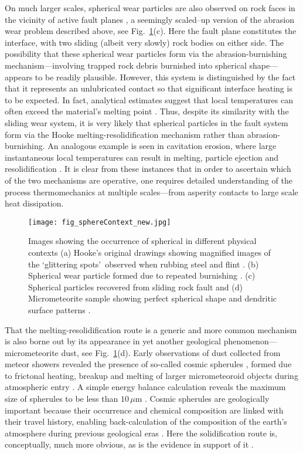 \documentclass[11pt]{article}
\begin{document}
On much larger scales, spherical wear particles are also observed on rock faces in the vicinity of active fault planes \cite{swain1976wear}, a seemingly scaled--up version of the abrasion wear problem described above, see Fig.~\ref{fig:sphere_applications}(c). Here the fault plane constitutes the interface, with two sliding (albeit very slowly) rock bodies on either side. The possibility that these spherical wear particles form via the abrasion-burnishing mechanism---involving trapped rock debris burnished into spherical shape---appears to be readily plausible. However, this system is distinguished by the fact that it represents an unlubricated contact so that significant interface heating is to be expected. In fact, analytical estimates suggest that local temperatures can often exceed the material's melting point \cite{MckenzieBrune1972}. Thus, despite its similarity with the sliding wear system, it is very likely that spherical particles in the fault system form via the Hooke melting-resolidification mechanism rather than abrasion-burnishing. An analogous example is seen in cavitation erosion, where large instantaneous local temperatures can result in melting, particle ejection and resolidification \cite{HaoshengETAL2008, FlintSuslick1991}. It is clear from these instances that in order to ascertain which of the two mechanisms are operative, one requires detailed understanding of the process thermomechanics at multiple scales---from asperity contacts to large scale heat dissipation.  


\begin{figure}
  \centering
  \texttt{[image: fig\_sphereContext\_new.jpg]}
  \caption{Images showing the occurrence of spherical in different physical contexts (a) Hooke's original drawings showing magnified images of the \lq glittering spots\rq\ observed when rubbing steel and flint \cite{HookeMicrographia}. (b) Spherical wear particle formed due to repeated burnishing \cite{ScottMills1973b}. (c) Spherical particles recovered from sliding rock fault \cite{swain1976wear} and (d) Micrometeorite sample showing perfect spherical shape and dendritic surface patterns \cite{TomkinsETAL2016}.}
  \label{fig:sphere_applications}
\end{figure}


That the melting-resolidification route is a generic and more common mechanism is also borne out by its appearance in yet another geological phenomenon---micrometeorite dust, see Fig.~\ref{fig:sphere_applications}(d). Early observations of dust collected from meteor showers revealed the presence of so-called cosmic spherules \cite{Landsberg1947}, formed due to frictonal heating, breakup and melting of larger micrometeoroid objects during atmospheric entry \cite{GengeETAL2008}. A simple energy balance calculation reveals the maximum size of spherules to be less than $10\,\mu$m \cite{WhipplePNAS1950}. Cosmic spherules are geologically important because their occurrence and chemical composition are linked with their travel history, enabling back-calculation of the composition of the earth's atmosphere during previous geological eras \cite{LoveBrownlee1991}. Here the solidification route is, conceptually, much more obvious, as is the evidence in support of it \cite{TomkinsETAL2016, PayneETAL2020}.
\end{document}
